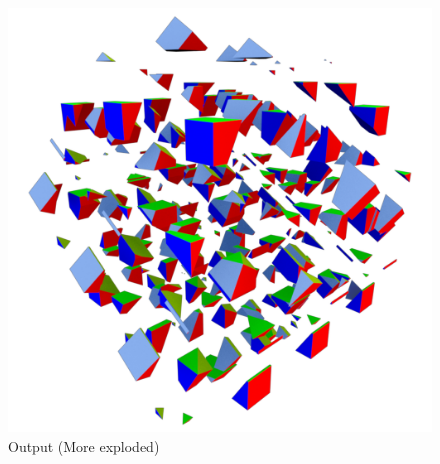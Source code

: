 \begin{figure}[h]
    \includegraphics[width=\textwidth]{./img/test-2.pdf}%
    \caption{Output (More exploded)}
\end{figure}

